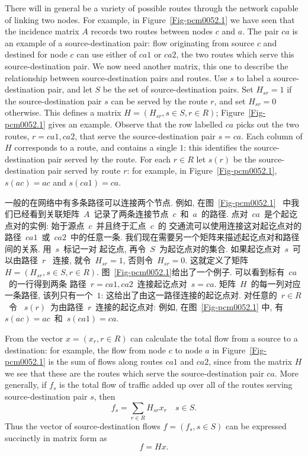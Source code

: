 \documentclass[a4paper,12pt, twocolumn]{article}
\begin{document}
There will in general be 
a variety of possible routes through the
network capable of linking two nodes. For example,
in Figure~\ref{Fig-pcm0052.1} we have seen that the
incidence matrix $A$ records two routes 
between nodes $c$ and $a$. The pair $ca$ is an
example of a source-destination pair: flow
originating  from source $c$ and destined
for node $c$ can use either of $ca1$ or $ca2$,
the two routes which serve this source-destination pair.
We now need another matrix, this one 
to describe the relationship between 
source-destination pairs and routes.
Use $s$ to label a source-destination pair,
and let $S$ be the set of source-destination pairs.
Set $H_{sr}=1$ if the 
source-destination pair $s$ can be served by the route
$r$, and set $H_{sr}=0$ otherwise. This defines a  matrix
$H=(H_{sr},s\in S,r\in R)$;
Figure~\ref{Fig-pcm0052.1} gives an example. 
Observe that
the row labelled $ca$ picks out the two routes, $r = ca1, ca2$, that
serve the source-destination pair $s=ca$. Each
column of $H$ corresponds to a route, 
and contains a single $1$: this identifies the
source-destination pair served by the route. 
For each $r\in R$ let $s(r)$
be the source-destination pair served by route $r$:
for example, in Figure~\ref{Fig-pcm0052.1}, $s(ac)=ac$ 
and $s(ca1)=ca$. 

一般的在网络中有多条路径可以连接两个节点. 例如, 在图~\ref{Fig-pcm0052.1}~
中我们已经看到关联矩阵~$A$~记录了两条连接节点~$c$~和~$a$~的路径. 
点对~$ca$~是个起讫点对的实例: 始于源点~$c$~并且终于汇点~$c$~的
交通流可以使用连接这对起讫点对的路径~$ca1$~或~$ca2$~中的任意一条. 
我们现在需要另一个矩阵来描述起讫点对和路径间的关系. 用~$s$~标记一对
起讫点, 再令~$S$~为起讫点对的集合. 如果起讫点对~$s$~可以由路径~$r$~
连接, 就令~$H_{sr}=1$, 否则令~$H_{sr}=0$. 这就定义了矩阵~$H=(H_{sr},s\in S,r\in R)$.
图~\ref{Fig-pcm0052.1}给出了一个例子. 可以看到标有~$ca$~的一行得到两条
路径~$r = ca1, ca2$~连接起讫点对~$s=ca$. 矩阵~$H$~的每一列对应一条路径, 
该列只有一个~$1$: 这给出了由这一路径连接的起讫点对. 对任意的~$r\in R$~令
~$s(r)$~为由路径~$r$~连接的起讫点对: 例如, 在图~\ref{Fig-pcm0052.1} 中, 
有~$s(ac)=ac$~和~$s(ca1)=ca$. 

From the vector $x =(x_r,r \in R)$
can calculate the total flow from a source to a destination:
for example, the flow from node $c$ to node $a$  in Figure~\ref{Fig-pcm0052.1}
is the sum of flows along routes $ca1$ and $ca2$, since from
the matrix $H$ we see that these are the routes which
serve the source-destination pair $ca$.
More generally, if $f_s$ is  the total flow of traffic added up
over all of the
routes serving source-destination pair $s$, then
\[
f_s  = \sum_{r \in R} H_{sr} x_r    \quad s 
\in S.
\]
Thus the  vector of source-destination flows $f =(f_s,s \in S )$
can be expressed succinctly in matrix form
as
\[
f = H x.
\]
\end{document}
